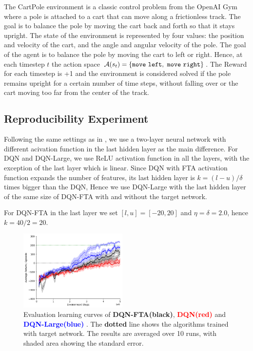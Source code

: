 \documentclass{article}
\newcommand{\cA}{\mathcal{A}}
\begin{document}
The CartPole environment is a classic control problem from the OpenAI Gym \cite[]{brockman2016gym} where a pole is attached to a cart that can move along a frictionless track. The goal is to balance the pole by moving the cart back and forth so that it stays upright. The state of the environment is represented by four values: the position and velocity of the cart, and the angle and angular velocity of the pole. The goal of the agent is to balance the pole by moving the cart to left or right. Hence, at each timestep $t$ the action space $\cA(s_t) = \tt\{move\ left,\ move\ right\}$. The Reward for each timestep is +1 and the environment is considered solved if the pole remains upright for a certain number of time steps, without falling over or the cart moving too far from the center of the track.


\subsection{Reproducibility Experiment} \label{sub-sec:reproduc experiments}
Following the same settings as in \cite{pan2019fuzzy}, we use a two-layer neural network with different acivation function in the last hidden layer as the main difference. For DQN and DQN-Large, we use ReLU activation function in all the layers, with the exception of the last layer which is linear.
Since DQN with FTA activation function expands the number of features, its last hidden layer is $k = (l-u)/\delta$ times bigger than the DQN, Hence we use DQN-Large with the last hidden layer of the same size of DQN-FTA with and without the target network.

For DQN-FTA in the last layer we set $[l, u] = [-20, 20]$ and $\eta = \delta = 2.0$, hence $k = 40/2 = 20$.


\begin{figure}[h]
    \centering
    \includegraphics[height=4cm]{ftavrelu.png}
    \caption{Evaluation learning curves of {\bf DQN-FTA(black)}, {\textcolor{red} {\bf DQN(red)}} and {\textcolor{blue} {\bf DQN-Large(blue)} }. The {\bf dotted} line shows the algorithms trained with target network. The results are averaged over 10 runs, with shaded area showing the standard error.}
    \label{fig:ftavrelu}
\end{figure}
\end{document}
